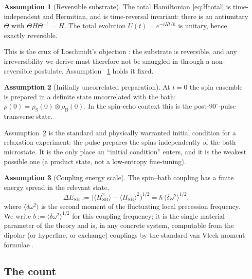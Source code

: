\documentclass[twocolumn,10pt,a4paper]{article}
\theoremstyle{thmstyle}
\theoremstyle{definition}
\newtheorem{assumption}{Assumption}
\theoremstyle{remark}
\newcommand{\sysrho}{\rho_{\mathrm{S}}}
\begin{document}
\begin{assumption}[Reversible substrate]
\label{ass:reversible}
The total Hamiltonian \eqref{eq:Htotal} is time-independent and Hermitian,
and is time-reversal invariant: there is an antiunitary $\Theta$ with
$\Theta H\Theta^{-1}=H$. The total evolution $U(t)=e^{-iHt/\hbar}$ is
unitary, hence exactly reversible.
\end{assumption}

This is the crux of Loschmidt's objection \citep{loschmidt1876}: the
substrate is reversible, and any irreversibility we derive must therefore
not be smuggled in through a non-reversible postulate. Assumption~%
\ref{ass:reversible} holds it fixed.

\begin{assumption}[Initially uncorrelated preparation]
\label{ass:product}
At $t=0$ the spin ensemble is prepared in a definite state uncorrelated
with the bath: $\rho(0)=\sysrho(0)\otimes\rho_{\mathrm{B}}(0)$. In the
spin-echo context this is the post-$90^{\circ}$-pulse transverse state.
\end{assumption}

Assumption~\ref{ass:product} is the standard and physically warranted
initial condition for a relaxation experiment: the pulse prepares the
spins independently of the bath microstate. It is the only place an
``initial condition'' enters, and it is the weakest possible one (a
product state, not a low-entropy fine-tuning).

\begin{assumption}[Coupling energy scale]
\label{ass:coupling}
The spin--bath coupling has a finite energy spread in the relevant state,
\begin{equation}
\Delta E_{\mathrm{SB}}
  := \bigl(\langle H_{\mathrm{SB}}^{2}\rangle
          - \langle H_{\mathrm{SB}}\rangle^{2}\bigr)^{1/2}
  = \hbar\,\langle\delta\omega^{2}\rangle^{1/2},
\label{eq:dE}
\end{equation}
where $\langle\delta\omega^{2}\rangle$ is the second moment of the
fluctuating local precession frequency. We write
$b:=\langle\delta\omega^{2}\rangle^{1/2}$ for this coupling frequency; it
is the single material parameter of the theory and is, in any concrete
system, computable from the dipolar (or hyperfine, or exchange) couplings
by the standard van Vleck moment formulae \citep{abragam1961}.
\end{assumption}

\subsection{The count}
\end{document}
